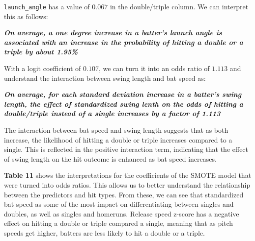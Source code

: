 \documentclass[
  letterpaper,
  DIV=11,
  numbers=noendperiod]{scrartcl}
\begin{document}
\texttt{launch\_angle} has a value of \(0.067\) in the double/triple
column. We can interpret this as follows:

\textbf{\emph{On average, a one degree increase in a batter's launch
angle is associated with an increase in the probability of hitting a
double or a triple by about 1.95\%}}

With a logit coefficient of \(0.107\), we can turn it into an odds ratio
of \(1.113\) and understand the interaction between swing length and bat
speed as:

\textbf{\emph{On average, for each standard deviation increase in a
batter's swing length, the effect of standardized swing lenth on the
odds of hitting a double/triple instead of a single increases by a
factor of 1.113}}

The interaction between bat speed and swing length suggests that as both
increase, the likelihood of hitting a double or triple increases
compared to a single. This is reflected in the positive interaction
term, indicating that the effect of swing length on the hit outcome is
enhanced as bat speed increases.

\textbf{Table 11} shows the interpretations for the coefficients of the
SMOTE model that were turned into odds ratios. This allows us to better
understand the relationship between the predictors and hit types. From
these, we can see that standardized bat speed as some of the most impact
on differentiating between singles and doubles, as well as singles and
homeruns. Release speed z-score has a negative effect on hitting a
double or triple compared a single, meaning that as pitch speeds get
higher, batters are less likely to hit a double or a triple.

\newpage
\end{document}
